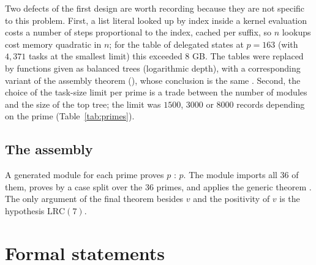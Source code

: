\documentclass[11pt]{article}
\theoremstyle{remark}
\begin{document}
Two defects of the first design are worth recording because they are not specific to this problem. First, a list literal looked up by index inside a kernel evaluation costs a number of steps proportional to the index, cached per suffix, so $n$ lookups cost memory quadratic in $n$; for the table of delegated states at $p=163$ (with $4{,}371$ tasks at the smallest limit) this exceeded 8 GB. The tables were replaced by functions given as balanced trees (logarithmic depth), with a corresponding variant of the assembly theorem (), whose conclusion is the same . Second, the choice of the task-size limit per prime is a trade between the number of modules and the size of the top tree; the limit was $1500$, $3000$ or $8000$ records depending on the prime (Table~\ref{tab:primes}).

\subsection{The assembly}

A generated module for each prime proves $p$ : $p$. The module  imports all $36$ of them, proves  by a case split over the $36$ primes, and applies the generic theorem . The only argument of the final theorem besides $v$ and the positivity of $v$ is the hypothesis $\mathrm{LRC}(7)$.

\section{Formal statements}\label{sec:lean}
\end{document}
